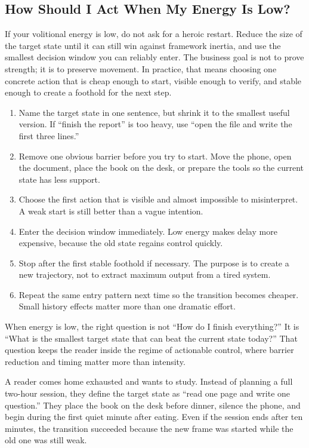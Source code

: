 \subsection{How Should I Act When My Energy Is Low?}

If your volitional energy is low, do not ask for a heroic restart. Reduce the
size of the target state until it can still win against framework inertia, and
use the smallest decision window you can reliably enter. The business goal is
not to prove strength; it is to preserve movement. In practice, that means
choosing one concrete action that is cheap enough to start, visible enough to
verify, and stable enough to create a foothold for the next step.

\begin{enumerate}[nosep]
  \item Name the target state in one sentence, but shrink it to the smallest
        useful version. If ``finish the report'' is too heavy, use ``open the
        file and write the first three lines.''
  \item Remove one obvious barrier before you try to start. Move the phone,
        open the document, place the book on the desk, or prepare the tools so
        the current state has less support.
  \item Choose the first action that is visible and almost impossible to
        misinterpret. A weak start is still better than a vague intention.
  \item Enter the decision window immediately. Low energy makes delay more
        expensive, because the old state regains control quickly.
  \item Stop after the first stable foothold if necessary. The purpose is to
        create a new trajectory, not to extract maximum output from a tired
        system.
  \item Repeat the same entry pattern next time so the transition becomes
        cheaper. Small history effects matter more than one dramatic effort.
\end{enumerate}

\begin{remark}
When energy is low, the right question is not ``How do I finish everything?''
It is ``What is the smallest target state that can beat the current state
today?'' That question keeps the reader inside the regime of actionable
control, where barrier reduction and timing matter more than intensity.
\end{remark}

\begin{example}
A reader comes home exhausted and wants to study. Instead of planning a full
two-hour session, they define the target state as ``read one page and write
one question.'' They place the book on the desk before dinner, silence the
phone, and begin during the first quiet minute after eating. Even if the
session ends after ten minutes, the transition succeeded because the new frame
was started while the old one was still weak.
\end{example}
